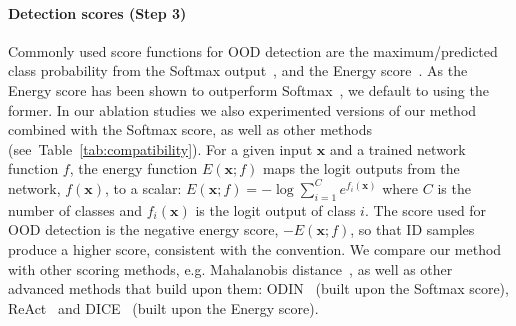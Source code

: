 \documentclass{article}
\newcommand{\tablabel}[1]{\label{tab:#1}}
\newcommand{\tabref}[1]{Table~\ref{tab:#1}}
\begin{document}
\begin{table}[hbt!]
\centering
{}
\caption{\textbf{Datasets and models in our OOD experiments.} We cover both moderate and large scale OOD benchmark settings, including evaluations on up to 10 OOD datasets and 3 architectures. }
\tablabel{benchmarks_table}
\end{table}


\paragraph{Detection scores (Step 3)}
Commonly used score functions for OOD detection are the maximum/predicted class probability from the Softmax output~\citep{hendrycks17baseline}, and the Energy score~\citep{liu2020energy}.
As the Energy score has been shown to outperform Softmax~\citep{liu2020energy, react}, we default to using the former. In our ablation studies we also experimented versions of our method combined with the Softmax score, as well as other methods (see~\tabref{compatibility}). For a given input $\mathbf{x}$ and a trained network function $f$, the energy function $E(\mathbf{x}; f)$ maps the logit outputs from the network, $f(\mathbf{x})$, to a scalar: $        E(\mathbf{x}; f) = - \log \sum_{i=1}^C e^{f_i(\mathbf{x})}$
where $C$ is the number of classes and $f_i(\mathbf{x})$ is the logit output of class $i$.
The score used for OOD detection is the negative energy score, $-E(\mathbf{x}; f)$, so that ID samples produce a higher score, consistent with the convention. We compare our method with other scoring methods, e.g. Mahalanobis distance~\citep{mahalanobis}, as well as other advanced methods that build upon them: ODIN~\citep{Liang2017} (built upon the Softmax score), ReAct~\citep{react} and DICE~\citep{sun2022dice} (built upon the Energy score).
\end{document}
